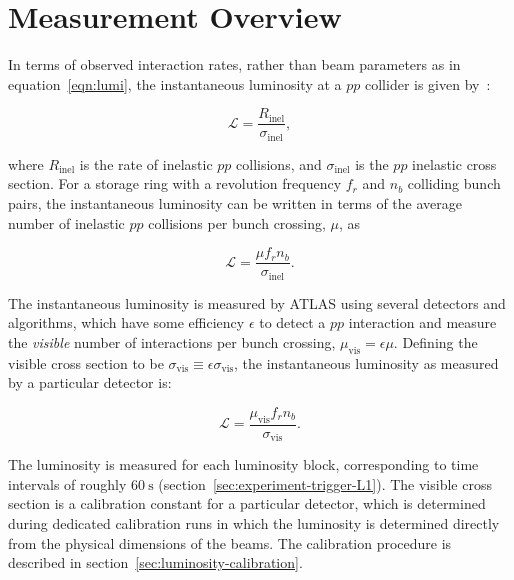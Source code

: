 
\section{Measurement Overview}\label{sec:luminosity-overview}
In terms of observed interaction rates, rather than beam parameters as in equation~\ref{eqn:lumi}, the instantaneous luminosity at a $pp$ collider is given by~\cite{Grafstrom:2015go,Aad:2013ucp}:

\begin{equation}
	\mathcal{L} = \frac{R_{\mathrm{inel}}}{\sigma_{\mathrm{inel}}},
\end{equation}

where $R_{\mathrm{inel}}$ is the rate of inelastic $pp$ collisions, and $\sigma_{\mathrm{inel}}$ is the $pp$ inelastic cross section. For a storage ring with a revolution frequency $f_r$ and $n_b$ colliding bunch pairs, the instantaneous luminosity can be written in terms of the average number of inelastic $pp$ collisions per bunch crossing, $\mu$, as 

\begin{equation}
	\mathcal{L} = \frac{\mu f_r n_b}{\sigma_{\mathrm{inel}}}.
\end{equation}

The instantaneous luminosity is measured by ATLAS using several detectors and algorithms, which have some efficiency $\epsilon$ to detect a $pp$ interaction and measure the \emph{visible} number of interactions per bunch crossing, $\mu_{\mathrm{vis}} = \epsilon \mu$. Defining the visible cross section to be $\sigma_{\mathrm{vis}}\equiv \epsilon \sigma_{\mathrm{vis}}$, the instantaneous luminosity as measured by a particular detector is:

\begin{equation}\label{eqn:luminosity-detected}
	\mathcal{L} = \frac{\mu_{\mathrm{vis}} f_r n_b}{\sigma_{\mathrm{vis}}}.
\end{equation}

The luminosity is measured for each luminosity block, corresponding to time intervals of roughly $\SI{60}{\second}$ (section~\ref{sec:experiment-trigger-L1}). The visible cross section is a calibration constant for a particular detector, which is determined during dedicated calibration runs in which the luminosity is determined directly from the physical dimensions of the beams. The calibration procedure is described in section~\ref{sec:luminosity-calibration}. 

